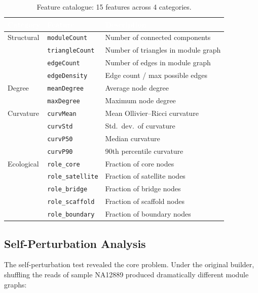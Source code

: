 \documentclass{../yalumba}
\begin{document}
\begin{table}[H]
\centering
\caption{Feature catalogue: 15 features across 4 categories.}
\label{tab:features}
\begin{tabular}{lll}
\toprule
\rowcolor{table-header}
\textcolor{white}{\textbf{Category}} & \textcolor{white}{\textbf{Feature}} & \textcolor{white}{\textbf{Description}} \\
\midrule
Structural & \texttt{moduleCount}    & Number of connected components \\
           & \texttt{triangleCount}  & Number of triangles in module graph \\
           & \texttt{edgeCount}      & Number of edges in module graph \\
           & \texttt{edgeDensity}    & Edge count / max possible edges \\
\midrule
Degree     & \texttt{meanDegree}     & Average node degree \\
           & \texttt{maxDegree}      & Maximum node degree \\
\midrule
Curvature  & \texttt{curvMean}       & Mean Ollivier--Ricci curvature \\
           & \texttt{curvStd}        & Std.\ dev.\ of curvature \\
           & \texttt{curvP50}        & Median curvature \\
           & \texttt{curvP90}        & 90th percentile curvature \\
\midrule
Ecological & \texttt{role\_core}      & Fraction of core nodes \\
           & \texttt{role\_satellite} & Fraction of satellite nodes \\
           & \texttt{role\_bridge}    & Fraction of bridge nodes \\
           & \texttt{role\_scaffold}  & Fraction of scaffold nodes \\
           & \texttt{role\_boundary}  & Fraction of boundary nodes \\
\bottomrule
\end{tabular}
\end{table}

\subsection{Self-Perturbation Analysis}

The self-perturbation test revealed the core problem. Under the original builder,
shuffling the reads of sample NA12889 produced dramatically different module
graphs:
\end{document}
